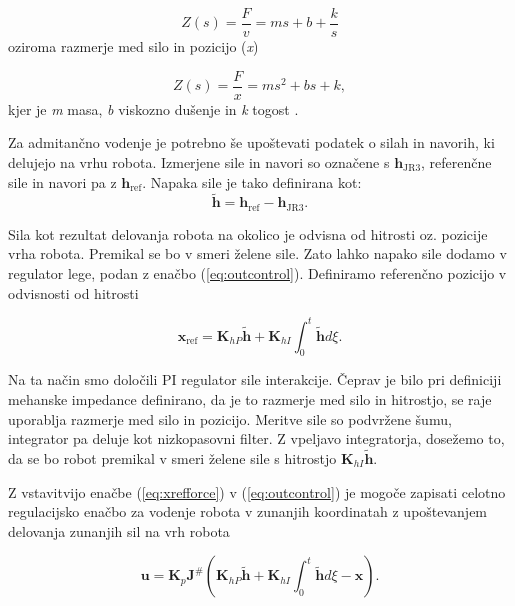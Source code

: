 \documentclass[a4paper]{article}
\begin{document}
\begin{equation}
Z(s) = \frac{F}{v} = ms + b + \frac{k}{s}
\end{equation}
oziroma razmerje med silo in pozicijo (\textit{x})

\begin{equation}
Z(s) = \frac{F}{x} = ms^2 + bs + k,
\end{equation}
kjer je \textit{m} masa, \textit{b} viskozno dušenje in \textit{k} togost \cite{mihelj_hapt}.



Za admitančno vodenje je potrebno še upoštevati podatek o silah in navorih, ki delujejo na vrhu robota. Izmerjene sile in navori so označene s $\textbf{h}_{\mathrm{JR3}}$, referenčne sile in navori pa z $\textbf{h}_{\mathrm{ref}}$. Napaka sile je tako definirana kot:
\begin{equation} \label{eq:herr}
\tilde{\textbf{h}} = \textbf{h}_{\mathrm{ref}} - \textbf{h}_{\mathrm{JR3}}.
\end{equation}

Sila kot rezultat delovanja robota na okolico je odvisna od hitrosti oz. pozicije vrha robota. Premikal se bo v smeri želene sile. Zato lahko napako sile dodamo v regulator lege, podan z enačbo (\ref{eq:outcontrol}). Definiramo referenčno pozicijo v odvisnosti od hitrosti

\begin{equation} \label{eq:xrefforce}
\textbf{x}_{\mathrm{ref}} = \textbf{K}_{hP}\tilde{\textbf{h}} + \textbf{K}_{hI} \int_{0}^{t}\tilde{\textbf{h}}d\xi.
\end{equation}

Na ta način smo določili PI regulator sile interakcije. Čeprav je bilo pri definiciji mehanske impedance definirano, da je to razmerje med silo in hitrostjo, se raje uporablja razmerje med silo in pozicijo. Meritve sile so podvržene šumu, integrator pa deluje kot nizkopasovni filter. Z vpeljavo integratorja, dosežemo to, da se bo robot premikal v smeri želene sile s hitrostjo $\textbf{K}_{hI} \tilde{\textbf{h}}$.

Z vstavitvijo enačbe (\ref{eq:xrefforce}) v (\ref{eq:outcontrol}) je mogoče zapisati celotno regulacijsko enačbo za vodenje robota v zunanjih koordinatah z upoštevanjem delovanja zunanjih sil na vrh robota

\begin{equation} \label{eq:admitcontrol}
\textbf{u} = \textbf{K}_p  \textbf{J}^{\#}(\textbf{K}_{hP}\tilde{\textbf{h}} + \textbf{K}_{hI} \int_{0}^{t}\tilde{\textbf{h}}d\xi - \textbf{x}).
\end{equation}
\end{document}

